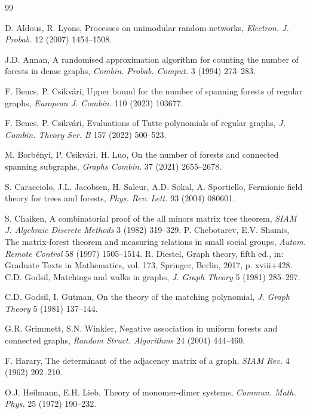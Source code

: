 \documentclass[11pt, a4paper]{article}
\theoremstyle{plain}
\begin{document}
\begin{thebibliography}{99}

D. Aldous, R. Lyons, Processes on unimodular random networks,  {\em Electron. J. Probab. } 12 (2007) 1454--1508.

J.D. Annan, A randomised approximation algorithm for counting the number of forests in dense graphs,  {\em Combin. Probab. Comput. } 3 (1994) 273--283.

F. Bencs, P. Csikv\'ari, Upper bound for the number of spanning forests of regular graphs,  {\em European J. Combin. } 110 (2023) 103677.

F. Bencs, P. Csikv\'ari, Evaluations of Tutte polynomials of regular graphs, {\em J. Combin. Theory Ser. B} 157 (2022) 500--523.


M. Borb\'enyi, P. Csikv\'ari, H. Luo, On the number of forests and connected spanning subgraphs,  {\em Graphs Combin. } 37 (2021) 2655--2678.

S. Caracciolo, J.L. Jacobsen, H. Saleur, A.D. Sokal, A. Sportiello, Fermionic field theory for trees and forests,  {\em Phys. Rev. Lett. } 93 (2004) 080601.

S. Chaiken, A combinatorial proof of the all minors matrix tree theorem,  {\em SIAM J. Algebraic Discrete Methods} 3 (1982) 319--329.
P.  Chebotarev, E.V. Shamis, The matrix-forest theorem and measuring relations in small social groups,  {\em Autom. Remote Control} 58 (1997) 1505--1514.
R. Diestel, Graph theory, fifth ed., in: Graduate Texts in Mathematics, vol. 173, Springer, Berlin, 2017, p. xviii+428.
C.D. Godsil, Matchings and walks in graphs,  {\em J. Graph Theory} 5 (1981) 285--297.

C.D. Godsil, I. Gutman, On the theory of the matching polynomial,  {\em J. Graph Theory} 5 (1981) 137--144.

G.R. Grimmett, S.N. Winkler, Negative association in uniform forests and connected graphs,  {\em Random Struct. Algorithms} 24 (2004) 444--460.

F. Harary, The determinant of the adjacency matrix of a graph,  {\em SIAM Rev. } 4 (1962) 202--210.

O.J. Heilmann, E.H. Lieb, Theory of monomer-dimer systems,  {\em Commun. Math. Phys. } 25 (1972) 190--232.


\end{thebibliography}
\end{document}
